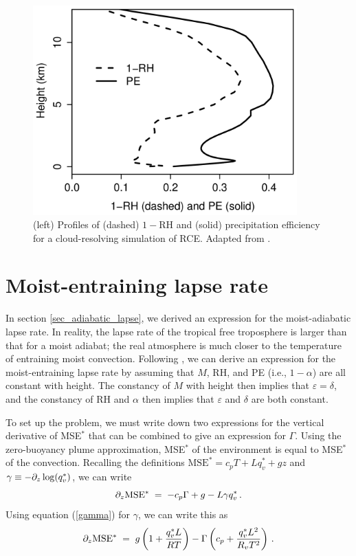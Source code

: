 \documentclass[12pt]{article}
\newcommand{\rh}{{\text{RH}}}
\newcommand{\mse}{{\text{MSE}}}
\begin{document}
\begin{figure}
\begin{center}
\includegraphics[width=4in]{../figures/17leshouches_precipeff.png}
\caption{(left) Profiles of (dashed) $1-\rh$ and (solid) precipitation efficiency for a cloud-resolving simulation of RCE.  Adapted from \citet{13lapse}.}
\label{17leshouches_precipeff}
\end{center}
\end{figure}


\section{Moist-entraining lapse rate}


In section \ref{sec_adiabatic_lapse}, we derived an expression for the moist-adiabatic lapse rate.  In reality, the lapse rate of the tropical free troposphere is larger than that for a moist adiabat; the real atmosphere is much closer to the temperature of entraining moist convection.  Following \citet{15cape}, we can derive an expression for the moist-entraining lapse rate by assuming that $M$, RH, and PE (i.e., $1-\alpha$) are all constant with height.  The constancy of $M$ with height then implies that $\varepsilon = \delta$, and the constancy of RH and $\alpha$ then implies that $\varepsilon$ and $\delta$ are both constant.


To set up the problem, we must write down two expressions for the vertical derivative of MSE$^*$ that can be combined to give an expression for $\Gamma$.  Using the zero-buoyancy plume approximation, MSE$^*$ of the environment is equal to MSE$^*$ of the convection.  Recalling the definitions $\mse^* = c_p T + L q_v^* + gz$ and $\gamma \equiv -\partial_z \log(q_v^*)$, we can write 
\[
\ppz \mse{}^* \; = \; -c_p \Gamma + g - L \gamma q_v^* \, .
\]
Using equation (\ref{gamma}) for $\gamma$, we can write this as
\begin{equation}
\ppz \mse{}^* \; = \; g \left( 1 + \frac{q_v^* L}{R T} \right) - \Gamma \left( c_p + \frac{q_v^* L^2}{R_v T^2} \right) \, . \label{dhsdz_1}
\end{equation}
\end{document}
